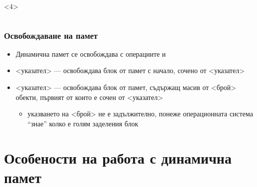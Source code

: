 \documentclass{beamer}
\begin{document}
\begin{frame}[fragile]
\begin{columns}[T,onlytextwidth]
\begin{column}{.5\textwidth}
\begin{overlayarea}{.5\textwidth}{16em}
        \begin{onlyenv}<4>
        \end{onlyenv}
      \end{overlayarea}
  \end{column}
  \end{columns}
\end{frame}

\begin{frame}
  \frametitle{Освобождаване на памет}

  \begin{itemize}[<+->]
  \item Динамична памет се освобождава с операциите  и 
  \item {}<указател> --- освобождава блок от памет с начало, сочено от <указател>
  \item {} <указател> --- освобождава блок от памет, съдържащ масив от <брой> обекти, първият от които е сочен от <указател>
    \begin{itemize}
    \item указването на <брой> не е задължително, понеже операционната система ``знае'' колко е голям заделения блок
    \end{itemize}
  \end{itemize}
\end{frame}

\section{Особености на работа с динамична памет}
\end{document}
